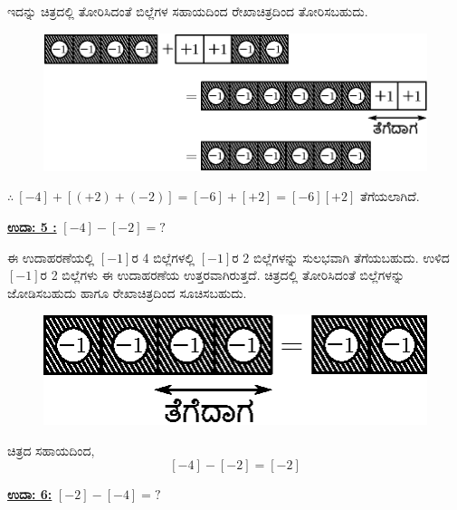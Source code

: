ಇದನ್ನು ಚಿತ್ರದಲ್ಲಿ ತೋರಿಸಿದಂತೆ ಬಿಲ್ಲೆಗಳ ಸಹಾಯದಿಂದ ರೇಖಾಚಿತ್ರದಿಂದ ತೋರಿಸಬಹುದು.
\begin{figure}[H]
\centering
\includegraphics[scale=0.8]{src/figure/chap3/fig3-15b.eps}
\end{figure}
$\therefore \ [-4]+[(+2)+(-2)]=[-6]+[+2]=[-6]$\qquad $[+2]$ ತೆಗೆಯಲಾಗಿದೆ.


\noindent
{\textbf{\underline{ಉದಾ: 5 :}}} $[-4] - [-2] = ?$

ಈ ಉದಾಹರಣೆಯಲ್ಲಿ $[-1]$ರ 4 ಬಿಲ್ಲೆಗಳಲ್ಲಿ $[-1]$ರ 2 ಬಿಲ್ಲೆಗಳನ್ನು ಸುಲಭವಾಗಿ ತೆಗೆಯ\-ಬಹುದು. ಉಳಿದ $[-1]$ರ 2 ಬಿಲ್ಲೆಗಳು ಈ ಉದಾಹರಣೆಯ ಉತ್ತರವಾಗಿರುತ್ತದೆ. ಚಿತ್ರದಲ್ಲಿ ತೋರಿಸಿದಂತೆ ಬಿಲ್ಲೆಗಳನ್ನು ಜೋಡಿಸಬಹುದು ಹಾಗೂ ರೇಖಾಚಿತ್ರದಿಂದ ಸೂಚಿಸಬಹುದು. 
\begin{figure}[H]
\centering
\includegraphics[scale=0.8]{src/figure/chap3/fig3-16b.eps}
\end{figure}

ಚಿತ್ರದ ಸಹಾಯದಿಂದ, 
~
\vskip -0.5cm
$$
[-4] - [-2] = [-2]
$$


\noindent
{\textbf{\underline{ಉದಾ: 6:}}} $[-2] - [-4] = ?$

